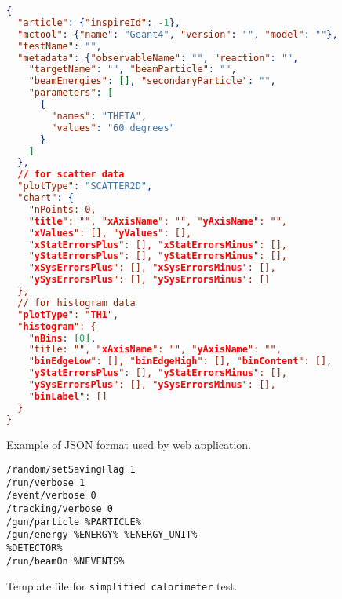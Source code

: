 


\begin{figure}

\begin{lstlisting}[language=json,firstnumber=1]
{
  "article": {"inspireId": -1},
  "mctool": {"name": "Geant4", "version": "", "model": ""},
  "testName": "",
  "metadata": {"observableName": "", "reaction": "",
    "targetName": "", "beamParticle": "",
    "beamEnergies": [], "secondaryParticle": "",
    "parameters": [
      {
        "names": "THETA",
        "values": "60 degrees"
      }
    ]
  },
  // for scatter data
  "plotType": "SCATTER2D",
  "chart": {
    "nPoints: 0,
    "title": "", "xAxisName": "", "yAxisName": "",
    "xValues": [], "yValues": [],
    "xStatErrorsPlus": [], "xStatErrorsMinus": [],
    "yStatErrorsPlus": [], "yStatErrorsMinus": [],
    "xSysErrorsPlus": [], "xSysErrorsMinus": [],
    "ySysErrorsPlus": [], "ySysErrorsMinus": []
  },
  // for histogram data
  "plotType": "TH1",
  "histogram": {
    "nBins: [0],
    "title: "", "xAxisName": "", "yAxisName": "",
    "binEdgeLow": [], "binEdgeHigh": [], "binContent": [],
    "yStatErrorsPlus": [], "yStatErrorsMinus": [],
    "ySysErrorsPlus": [], "ySysErrorsMinus": [],
    "binLabel": []
  }
}
\end{lstlisting}

\caption{Example of JSON format used by web application.}
\label{JSON-format}
\end{figure}

\begin{figure}
\begin{verbatim}
/random/setSavingFlag 1
/run/verbose 1
/event/verbose 0
/tracking/verbose 0
/gun/particle %PARTICLE%
/gun/energy %ENERGY% %ENERGY_UNIT%
%DETECTOR%
/run/beamOn %NEVENTS%
\end{verbatim}
\caption{Template file for {\tt simplified calorimeter} test.}
\label{sc-template}
\end{figure}

